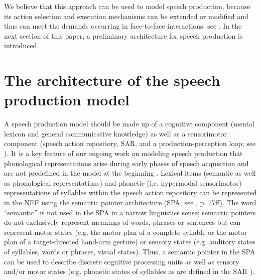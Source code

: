 \documentclass[conference]{IEEEtran}
\begin{document}
We believe that this approach can be used to model speech
production, because its action selection and
execution mechanisms can be extended or modified
and thus can meet the demands occurring in face-to-face interactions;
see \cite{kroger2011}. In the next section of this paper,
a preliminary architecture for speech production is introduced.

\section{The architecture of the speech production model}

A speech production model should be made up of a cognitive component
(mental lexicon and general communicative knowledge) as well as a sensorimotor component (speech action
repository, SAR, and a production-perception loop; see
\cite{kroger2009,kroger2014,kroger2012,kroger2011a,eckers2013,eckers2013a,kroger2010}).
It is a key feature of our ongoing work on modeling speech production
that phonological representations arise during
early phases of speech acquisition and are not predefined in the model
at the beginning
\cite{kroger2009,kroger2014,kroger2011}. Lexical items (semantic as
well as phonological representations) and phonetic (i.e.
hypermodal sensorimotor) representations of syllables within the
speech action repository
\cite{kroger2012,kroger2011a,eckers2013,eckers2013a,kroger2010} can be
represented in the NEF using the semantic pointer architecture (SPA; see
\cite{eliasmith2013}, p. 77ff). The word ``semantic'' is not used in
the SPA in a narrow linguistics sense; semantic pointers do not
exclusively represent meanings of words, phrases or sentences
but can represent motor states (e.g. the motor plan
of a complete syllable or the motor plan of a
target-directed hand-arm gesture) or sensory states
(e.g. auditory states of syllables, words or phrases, visual states).
Thus, a semantic pointer in the SPA can be used to describe
discrete cognitive processing units as well as sensory and/or motor
states (e.g. phonetic states of syllables as are defined in the SAR
\cite{kroger2012,kroger2011a,eckers2013,eckers2013a,kroger2010}).
\end{document}
